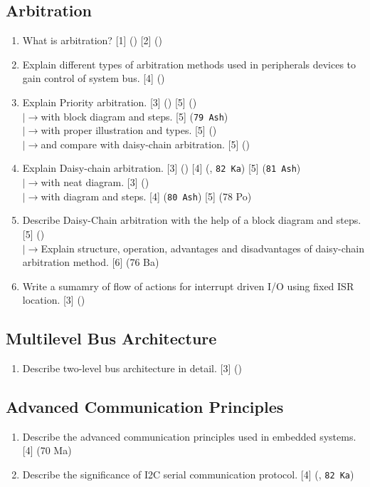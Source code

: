 \documentclass[12pt]{article}
\newcommand{\lb}{\\$\left|\rightarrow\right.$}
\begin{document}
  \subsection{Arbitration}
    \begin{enumerate}
      \item What is arbitration? \hfill [1] () [2] ()

      \item Explain different types of arbitration methods used in peripherals devices to gain control of system bus. \hfill [4] ()

      \item Explain Priority arbitration. \hfill [3] () [5] ()
        \lb with block diagram and steps. \hfill [5] (\texttt{79 Ash})
      \lb with proper illustration and types. \hfill [5] ()
      \lb and compare with daisy-chain arbitration. \hfill [5] ()

      \item Explain Daisy-chain arbitration. \hfill [3] () [4] (, \texttt{82 Ka}) [5] (\texttt{81 Ash})
      \lb with neat diagram. \hfill [3] ()
      \lb with diagram and steps. \hfill [4] (\texttt{80 Ash}) [5] (78 Po)

      \item Describe Daisy-Chain arbitration with the help of a block diagram and steps. \hfill [5] ()
      \lb Explain structure, operation, advantages and disadvantages of daisy-chain arbitration method. \hfill [6] (76 Ba)

      \item Write a sumamry of flow of actions for interrupt driven I/O using fixed ISR location. \hfill [3] ()
    \end{enumerate}

  \subsection{Multilevel Bus Architecture}
    \begin{enumerate}
      \item Describe two-level bus architecture in detail. \hfill [3] ()
    \end{enumerate}

  \subsection{Advanced Communication Principles}
    \begin{enumerate}
      \item Describe the advanced communication principles used in embedded systems. \hfill [4] (70 Ma)

      \item Describe the significance of I2C serial communication protocol. \hfill [4] (, \texttt{82 Ka})
    \end{enumerate}
\end{document}
